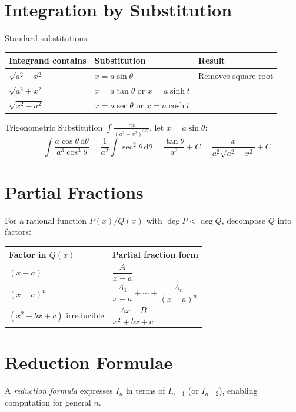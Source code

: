 \documentclass[12pt, a4paper]{book}
\newcommand{\dd}{\,\mathrm{d}}
\newcommand{\dx}{\,\mathrm{d}x}
\begin{document}
\section{Integration by Substitution}

Standard substitutions:
\begin{center}
\begin{tabular}{lll}
\toprule
Integrand contains & Substitution & Result\\
\midrule
$\sqrt{a^2-x^2}$ & $x=a\sin\theta$ & Removes square root\\
$\sqrt{a^2+x^2}$ & $x=a\tan\theta$ or $x=a\sinh t$ & \\
$\sqrt{x^2-a^2}$ & $x=a\sec\theta$ or $x=a\cosh t$ & \\
\bottomrule
\end{tabular}
\end{center}

\begin{example}{Trigonometric Substitution}{}
$\displaystyle\int\frac{\dx}{(a^2-x^2)^{3/2}}$, let $x=a\sin\theta$:
\[
= \int\frac{a\cos\theta\dd\theta}{a^3\cos^3\theta}=\frac{1}{a^2}\int\sec^2\theta\dd\theta=\frac{\tan\theta}{a^2}+C=\frac{x}{a^2\sqrt{a^2-x^2}}+C.
\]
\end{example}

\section{Partial Fractions}

For a rational function $P(x)/Q(x)$ with $\deg P<\deg Q$, decompose $Q$ into factors:

\begin{center}
\begin{tabular}{ll}
\toprule
Factor in $Q(x)$ & Partial fraction form\\
\midrule
$(x-a)$ & $\dfrac{A}{x-a}$\\[6pt]
$(x-a)^n$ & $\dfrac{A_1}{x-a}+\cdots+\dfrac{A_n}{(x-a)^n}$\\[6pt]
$(x^2+bx+c)$ irreducible & $\dfrac{Ax+B}{x^2+bx+c}$\\
\bottomrule
\end{tabular}
\end{center}

\section{Reduction Formulae}

A \emph{reduction formula} expresses $I_n$ in terms of $I_{n-1}$ (or $I_{n-2}$), enabling computation for general $n$.
\end{document}
